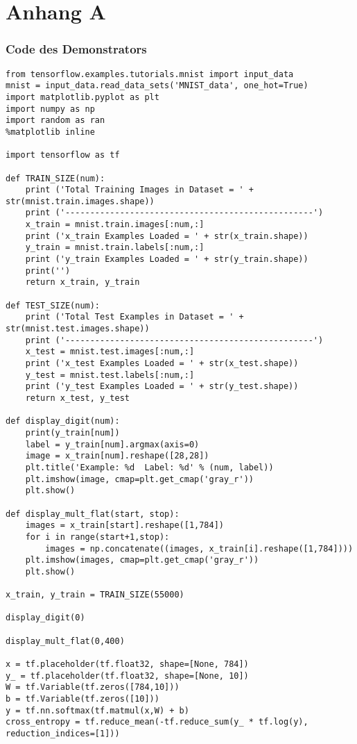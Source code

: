 \chapter{Anhang A}
\label{chap:anhang_a}

\subsection{Code des Demonstrators}
\label{sec:codeDemonstrator}
\begin{lstlisting}
from tensorflow.examples.tutorials.mnist import input_data
mnist = input_data.read_data_sets('MNIST_data', one_hot=True)
import matplotlib.pyplot as plt
import numpy as np
import random as ran
%matplotlib inline

import tensorflow as tf

def TRAIN_SIZE(num):
    print ('Total Training Images in Dataset = ' + str(mnist.train.images.shape))
    print ('--------------------------------------------------')
    x_train = mnist.train.images[:num,:]
    print ('x_train Examples Loaded = ' + str(x_train.shape))
    y_train = mnist.train.labels[:num,:]
    print ('y_train Examples Loaded = ' + str(y_train.shape))
    print('')
    return x_train, y_train

def TEST_SIZE(num):
    print ('Total Test Examples in Dataset = ' + str(mnist.test.images.shape))
    print ('--------------------------------------------------')
    x_test = mnist.test.images[:num,:]
    print ('x_test Examples Loaded = ' + str(x_test.shape))
    y_test = mnist.test.labels[:num,:]
    print ('y_test Examples Loaded = ' + str(y_test.shape))
    return x_test, y_test

def display_digit(num):
    print(y_train[num])
    label = y_train[num].argmax(axis=0)
    image = x_train[num].reshape([28,28])
    plt.title('Example: %d  Label: %d' % (num, label))
    plt.imshow(image, cmap=plt.get_cmap('gray_r'))
    plt.show()
        
def display_mult_flat(start, stop):
    images = x_train[start].reshape([1,784])
    for i in range(start+1,stop):
        images = np.concatenate((images, x_train[i].reshape([1,784])))
    plt.imshow(images, cmap=plt.get_cmap('gray_r'))
    plt.show()

x_train, y_train = TRAIN_SIZE(55000)

display_digit(0)

display_mult_flat(0,400)

x = tf.placeholder(tf.float32, shape=[None, 784])
y_ = tf.placeholder(tf.float32, shape=[None, 10])
W = tf.Variable(tf.zeros([784,10]))
b = tf.Variable(tf.zeros([10]))
y = tf.nn.softmax(tf.matmul(x,W) + b)
cross_entropy = tf.reduce_mean(-tf.reduce_sum(y_ * tf.log(y), reduction_indices=[1]))



\end{lstlisting}
